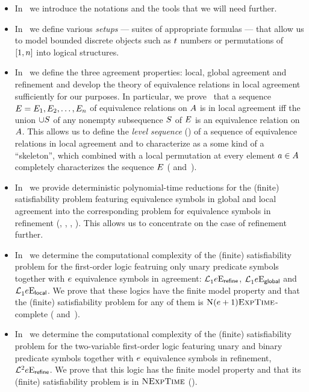 \begin{itemize}
  \item
  In~ we introduce the notations and the tools that we will
  need further.
  
  \item
  In~ we define various \emph{setups} --- suites of appropriate
  formulas --- that allow us to model bounded discrete objects such as $t$
  numbers or permutations of $[1,n]$ into logical structures.

  \item
  In~ we define the three agreement properties:
  local, global agreement and refinement and develop the theory of equivalence relations
  in local agreement sufficiently for our purposes.
  In particular, we prove~ that a sequence $E =
  E_{1},E_{2},\dots,E_{n}$ of equivalence relations on $A$ is in
  local agreement iff the union $\cup S$ of any nonempty subsequence $S$
  of $E$ is an equivalence relation on $A$.
  This allows us to define the \emph{level sequence} () of a
  sequence of equivalence relations in local agreement and to characterize as a
  some kind of a ``skeleton'', which combined with a local permutation at every
  element $a\in A$ completely characterizes the sequence $E$
  ( and~).
  
  \item
  In~ we provide deterministic polynomial-time reductions
  for the (finite) satisfiability problem featuring equivalence symbols in
  global and local agreement into the corresponding problem for equivalence
  symbols in refinement (,
  , ,
  ).
  This allows us to concentrate on the case of refinement further.
  
  \item
  In~ we determine the computational complexity of the
  (finite) satisfiability problem for the first-order logic featruing only unary
  predicate symbols together with $e$ equivalence symbols in agreement:
  $\mathcal{L}^{{}}_{1}{e}\mathrm{E}_{\mathsf{refine}}$,
  $\mathcal{L}^{{}}_{1}{e}\mathrm{E}_{\mathsf{global}}$ and 
  $\mathcal{L}^{{}}_{1}{e}\mathrm{E}_{\mathsf{local}}$.
  We prove that these logics have the finite model property and that the
  (finite) satisfiability problem for any of them is
  $\text{\normalfont{\scshape N}}(e+1)\text{\normalfont{\scshape ExpTime}}$-complete (
  and~).
  
  \item
  In~ we determine the computational complexity of the (finite)
  satisfiability problem for the two-variable first-order logic featuring unary
  and binary predicate symbols together with $e$ equivalence symbols in
  refinement,
  $\mathcal{L}^{2}_{{}}{e}\mathrm{E}_{\mathsf{refine}}$.
  We prove that this logic has the finite model property and that its (finite)
  satisfiability problem is in $\text{\normalfont{\scshape NExpTime}}$ ().
\end{itemize}

